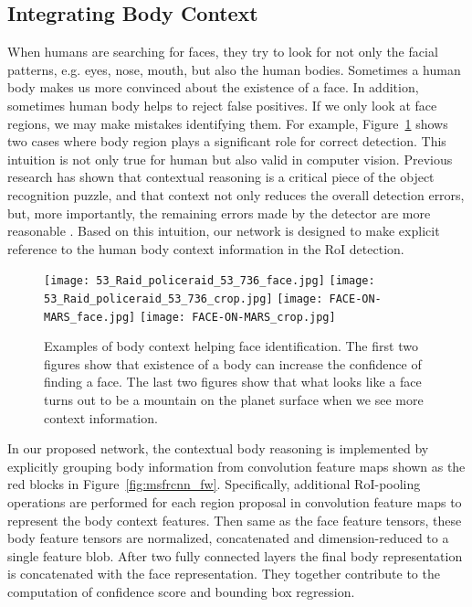 \documentclass[10pt,journal,cspaper,compsoc]{IEEEtran}
\begin{document}
\subsection{Integrating Body Context}
\label{subsec:context}
When humans are searching for faces, they try to look for not only the facial patterns, e.g. eyes, nose, mouth, but also the human bodies. Sometimes a human body makes us more convinced about the existence of a face. In addition, sometimes human body helps to reject false positives. If we only look at face regions, we may make mistakes identifying them. For example, Figure~\ref{fig:body_context} shows two cases where body region plays a significant role for correct detection. This intuition is not only true for human but also valid in computer vision. Previous research has shown that contextual reasoning is a critical piece of the object recognition puzzle, and that context not only reduces the overall detection errors, but, more importantly, the remaining errors made by the detector are more reasonable \cite{divvala2009empirical}. Based on this intuition, our network is designed to make explicit reference to the human body context information in the RoI detection.
\begin{figure}
\centering
\texttt{[image: 53\_Raid\_policeraid\_53\_736\_face.jpg]}
\texttt{[image: 53\_Raid\_policeraid\_53\_736\_crop.jpg]}
\texttt{[image: FACE-ON-MARS\_face.jpg]}
\texttt{[image: FACE-ON-MARS\_crop.jpg]}
\caption{Examples of body context helping face identification. The first two figures show that existence of a body can increase the confidence of finding a face. The last two figures show that what looks like a face turns out to be a mountain on the planet surface when we see more context information.}
\label{fig:body_context}
\end{figure}





In our proposed network, the contextual body reasoning is implemented by explicitly grouping body information from convolution feature maps shown as the red blocks in Figure~\ref{fig:msfrcnn_fw}. Specifically, additional RoI-pooling operations are performed for each region proposal in convolution feature maps to represent the body context features. Then same as the face feature tensors, these body feature tensors are normalized, concatenated and dimension-reduced to a single feature blob. After two fully connected layers the final body representation is concatenated with the face representation. They together contribute to the computation of confidence score and bounding box regression.
\end{document}
